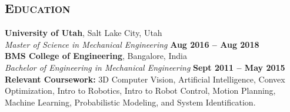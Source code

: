 \documentclass[margin, line]{resume}
\begin{document}
\begin{resume}



    \sectionline
    \section{\mysidestyle \textsc{Education}}
    \textbf{University of Utah}, Salt Lake City, Utah %
    \\\vspace{1mm}%
    \textsl{Master of Science in Mechanical Engineering} \hfill \textbf{ Aug 2016 -- Aug 2018}\\%
    \textbf{BMS College of Engineering}, Bangalore, India %
    \\\vspace{1mm}%
    \textsl{Bachelor of Engineering in Mechanical Engineering } \hfill \textbf{Sept 2011 -- May 2015}\\%
    \textbf{Relevant Coursework:} 3D Computer Vision, Artificial Intelligence,
    Convex Optimization, Intro to Robotics, Intro to Robot Control,
    Motion Planning, Machine Learning, Probabilistic Modeling, and
    System Identification.



\end{resume}
\end{document}
